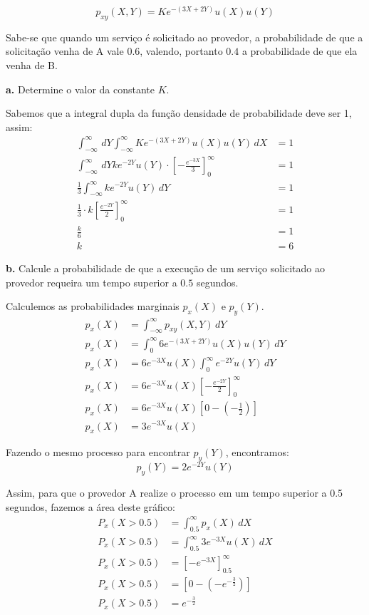 \documentclass[a5paper]{report}
\begin{document}
\[p_{xy}(X, Y) = Ke^{-(3X + 2Y)}u(X)u(Y)\]

Sabe-se que quando um serviço é solicitado ao provedor, a probabilidade de que
a solicitação venha de A vale $0.6$, valendo, portanto $0.4$ a probabilidade de que ela venha de B.

\textbf{a.} Determine o valor da constante $K$.

Sabemos que a integral dupla da função densidade de probabilidade deve ser 1, assim:
\begin{align*}
	\int_{-\infty}^{\infty} \, dY \int_{-\infty}^{\infty} Ke^{-(3X + 2Y)}u(X)u(Y) \, dX &= 1\\
	\int_{-\infty}^{\infty} \, dY ke^{-2Y} u(Y) \cdot \left[-\frac{e^{-3X}}{3}\right]_{0}^{\infty} &= 1\\
	\frac{1}{3} \int_{-\infty}^{\infty} ke^{-2Y} u(Y) \, dY &= 1\\
	\frac{1}{3} \cdot k \left[\frac{e^{-2Y}}{2}\right]_{0}^{\infty} &= 1\\
	\frac{k}{6} &= 1\\
	k &= 6
\end{align*}

\textbf{b.} Calcule a probabilidade de que a execução de um serviço solicitado ao provedor requeira um tempo superior a $0.5$ segundos.

Calculemos as probabilidades marginais $p_x(X)$ e $p_y(Y)$.
\begin{align*}
	p_x(X) &= \int_{-\infty}^{\infty} p_{xy}(X, Y) \, dY\\
	p_x(X) &= \int_{0}^{\infty} 6e^{-(3X + 2Y)}u(X)u(Y) \, dY\\
	p_x(X) &= 6e^{-3X}u(X)\int_{0}^{\infty} e^{-2Y}u(Y) \, dY\\
	p_x(X) &= 6e^{-3X}u(X)\left[-\frac{e^{-2Y}}{2}\right]_{0}^{\infty}\\
	p_x(X) &= 6e^{-3X}u(X) \left[0 - \left(-\frac{1}{2}\right)\right]\\
	p_x(X) &= 3e^{-3X}u(X)
\end{align*}

Fazendo o mesmo processo para encontrar $p_y(Y)$, encontramos:
\[p_y(Y) = 2e^{-2Y}u(Y)\]

Assim, para que o provedor A realize o processo em um tempo superior a 0.5 segundos, fazemos a área deste gráfico:
\begin{align*}
	P_x(X > 0.5) &= \int_{0.5}^{\infty} p_x(X) \, dX\\
	P_x(X > 0.5) &= \int_{0.5}^{\infty} 3e^{-3X}u(X) \, dX\\
	P_x(X > 0.5) &= \left[-e^{-3X}\right]_{0.5}^{\infty}\\
	P_x(X > 0.5) &= \left[0 - (-e^{-\frac{3}{2}})\right]\\
	P_x(X > 0.5) &= e^{-\frac{3}{2}}
\end{align*}
\end{document}
